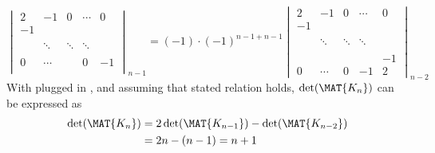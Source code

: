 \begin{equation}
	\begin{vmatrix}
		2  & -1      &  0     & \cdots  & 0\\
		-1 &         &        &         &   \\
		   &         &        &         &   \\
		   & \ddots  & \ddots & \ddots  &   \\
		   &         &        &         &   \\
		 0 & \cdots  &        &       0 & -1\\
	\end{vmatrix}_{n-1} = 
	(-1)\cdot(-1)^{n-1+n-1}
	\begin{vmatrix}
		2  & -1      &  0     & \cdots  & 0\\
		-1 &         &        &         &   \\
		   &         &        &         &   \\
		   & \ddots  & \ddots & \ddots  &   \\
		   &         &        &         &   \\
		   &         &        &         & -1\\
		0  & \cdots  &  0     &   -1    & 2
	\end{vmatrix}_{n-2}
	\label{eq:term2exp}
\end{equation}
With  plugged in , and assuming that stated relation holds, $\det(\MAT{K_n})$ can be expressed as
\begin{align}
	\det(\MAT{K_n}) &= 2 \det(\MAT{K_{n-1}}) - \det(\MAT{K_{n-2}})\\
					&= 2n - (n-1) = n+1
\end{align}